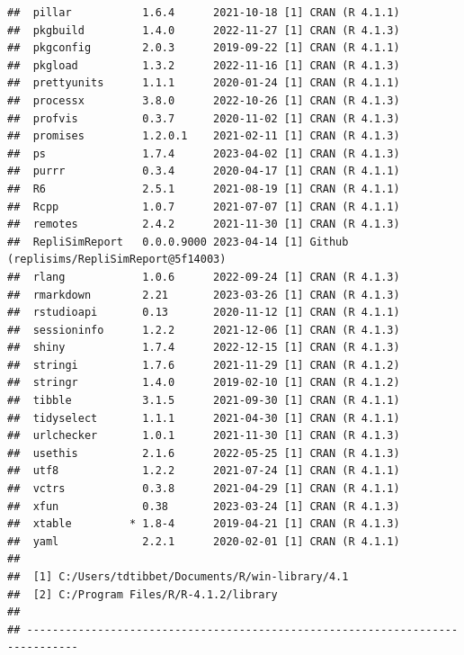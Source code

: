 \documentclass[10,a4paperpaper,]{article}
\begin{document}
\begin{verbatim}
##  pillar           1.6.4      2021-10-18 [1] CRAN (R 4.1.1)
##  pkgbuild         1.4.0      2022-11-27 [1] CRAN (R 4.1.3)
##  pkgconfig        2.0.3      2019-09-22 [1] CRAN (R 4.1.1)
##  pkgload          1.3.2      2022-11-16 [1] CRAN (R 4.1.3)
##  prettyunits      1.1.1      2020-01-24 [1] CRAN (R 4.1.1)
##  processx         3.8.0      2022-10-26 [1] CRAN (R 4.1.3)
##  profvis          0.3.7      2020-11-02 [1] CRAN (R 4.1.3)
##  promises         1.2.0.1    2021-02-11 [1] CRAN (R 4.1.3)
##  ps               1.7.4      2023-04-02 [1] CRAN (R 4.1.3)
##  purrr            0.3.4      2020-04-17 [1] CRAN (R 4.1.1)
##  R6               2.5.1      2021-08-19 [1] CRAN (R 4.1.1)
##  Rcpp             1.0.7      2021-07-07 [1] CRAN (R 4.1.1)
##  remotes          2.4.2      2021-11-30 [1] CRAN (R 4.1.3)
##  RepliSimReport   0.0.0.9000 2023-04-14 [1] Github (replisims/RepliSimReport@5f14003)
##  rlang            1.0.6      2022-09-24 [1] CRAN (R 4.1.3)
##  rmarkdown        2.21       2023-03-26 [1] CRAN (R 4.1.3)
##  rstudioapi       0.13       2020-11-12 [1] CRAN (R 4.1.1)
##  sessioninfo      1.2.2      2021-12-06 [1] CRAN (R 4.1.3)
##  shiny            1.7.4      2022-12-15 [1] CRAN (R 4.1.3)
##  stringi          1.7.6      2021-11-29 [1] CRAN (R 4.1.2)
##  stringr          1.4.0      2019-02-10 [1] CRAN (R 4.1.2)
##  tibble           3.1.5      2021-09-30 [1] CRAN (R 4.1.1)
##  tidyselect       1.1.1      2021-04-30 [1] CRAN (R 4.1.1)
##  urlchecker       1.0.1      2021-11-30 [1] CRAN (R 4.1.3)
##  usethis          2.1.6      2022-05-25 [1] CRAN (R 4.1.3)
##  utf8             1.2.2      2021-07-24 [1] CRAN (R 4.1.1)
##  vctrs            0.3.8      2021-04-29 [1] CRAN (R 4.1.1)
##  xfun             0.38       2023-03-24 [1] CRAN (R 4.1.3)
##  xtable         * 1.8-4      2019-04-21 [1] CRAN (R 4.1.3)
##  yaml             2.2.1      2020-02-01 [1] CRAN (R 4.1.1)
## 
##  [1] C:/Users/tdtibbet/Documents/R/win-library/4.1
##  [2] C:/Program Files/R/R-4.1.2/library
## 
## ------------------------------------------------------------------------------
\end{verbatim}
\end{document}
